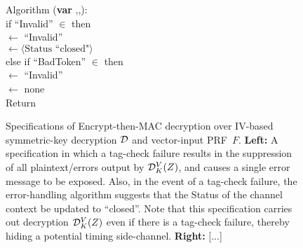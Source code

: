 \begin{figure}
{\medskip
Algorithm ({\bf var} ,,):\\
\nudge if ``Invalid'' $\in$  then \\
\nudge\nudge {} $\gets$ ``Invalid'' \\
\nudge\nudge {} $\gets \langle
\mbox{Status ``closed"} \rangle$\\
\nudge else if ``BadToken'' $\in$  then \\
\nudge\nudge {} $\gets$ ``Invalid'' \\
\nudge\nudge {} $\gets$ none \\
\nudge Return 
} 
\caption{Specifications of Encrypt-then-MAC decryption over IV-based
  symmetric-key decryption $\mathcal{D}$ and vector-input PRF~$F$.   {\bf
    Left:} A specification in which a tag-check failure results in the
suppression of all plaintext/errors output by $\mathcal{D}^V_K(Z)$, and
causes a single error message to be exposed.  Also,
in the event of a tag-check failure, the error-handling algorithm
suggests that the Status of the channel context be updated to
``closed''.  Note that this specification carries out decryption
$\mathcal{D}^V_K(Z)$ even if there is a tag-check failure, thereby hiding a
potential timing side-channel. 
%
{\bf
  Right: } [...]
}
\label{fig:EtM-aead}
\end{figure}
